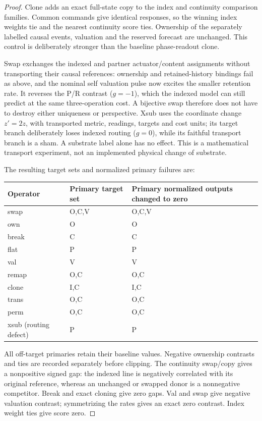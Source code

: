 \documentclass[11pt,a4paper]{article}
\theoremstyle{definition}
\begin{document}
\begin{proof}
Clone adds an exact full-state copy to the index and continuity comparison
families. Common commands give identical responses, so the winning index
weights tie and the nearest continuity score ties. Ownership of the separately
labelled causal events, valuation and the reserved forecast are unchanged.
This control is deliberately stronger than the baseline phase-readout clone.

Swap exchanges the indexed and partner actuator/content assignments without
transporting their causal references: ownership and retained-history bindings
fail as above, and the nominal self valuation pulse now excites the smaller
retention rate. It reverses the P/R contrast ($g=-1$), which the indexed model
can still predict at the same three-operation cost. A bijective swap therefore
does not have to destroy either uniqueness or perspective. Xsub uses the
coordinate change $z'=2z$, with transported metric, readings, targets and
cost units; its target branch deliberately loses indexed routing ($g=0$),
while its faithful transport branch is a sham. A substrate label alone has
no effect. This is a mathematical transport experiment, not an implemented
physical change of substrate.

The resulting target sets and normalized primary failures are:
\begin{center}
\small
\begin{tabular}{lll}
\toprule
Operator & Primary target set & Primary normalized outputs changed to zero\\
\midrule
swap & O,C,V & O,C,V\\
own & O & O\\
break & C & C\\
flat & P & P\\
val & V & V\\
remap & O,C & O,C\\
clone & I,C & I,C\\
trans & O,C & O,C\\
perm & O,C & O,C\\
xsub (routing defect) & P & P\\
\bottomrule
\end{tabular}
\end{center}
All off-target primaries retain their baseline values. Negative ownership
contrasts and ties are recorded separately before clipping. The continuity
swap/copy gives a nonpositive signed gap: the indexed line is negatively
correlated with its original reference, whereas an unchanged or swapped donor
is a nonnegative competitor. Break and exact cloning give zero gaps.
Val and swap give negative valuation contrast; symmetrizing the rates gives
an exact zero contrast. Index weight ties give score zero.


\end{proof}
\end{document}
